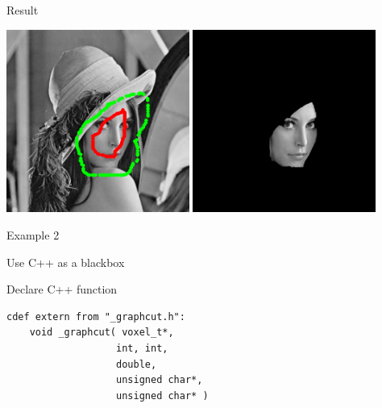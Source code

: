 \documentclass[12pt]{beamer}
\begin{document}
\begin{frame}{Result}

\begin{center}
\includegraphics[width=0.45\textwidth]{initialisation.png}
\hspace{0.04\textwidth}
\includegraphics[width=0.45\textwidth]{demo/graphcut1/segmentation.png}
\end{center}

\end{frame}

\begin{frame}
\begin{center}
\LARGE
\textcolor{specialblue}{Example 2}

\Large

\vspace{0.1\textheight}

Use C++ as a blackbox
\end{center}
\end{frame}

\begin{frame}[fragile]{Declare C++ function}

\begin{verbatim}
cdef extern from "_graphcut.h":
    void _graphcut( voxel_t*,
                   int, int,
                   double,
                   unsigned char*,
                   unsigned char* )
\end{verbatim}
\end{frame}
  
\end{document}
